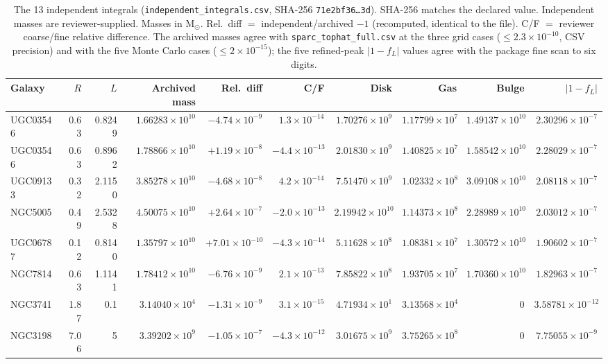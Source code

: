 \documentclass[10pt,a4paper]{article}
\newcommand{\Msun}{\mathrm{M}_\odot}
\begin{document}
\begin{table}[!htbp]\centering\scriptsize\setlength{\tabcolsep}{2.4pt}
\caption{The 13 independent integrals (\texttt{independent\_integrals.csv}, SHA-256 \texttt{71e2bf36\dots3d}). SHA-256 matches the declared value. Independent masses are reviewer-supplied. Masses in $\Msun$. Rel.\ diff $=$ independent/archived $-1$ (recomputed, identical to the file). C/F $=$ reviewer coarse/fine relative difference. The archived masses agree with \texttt{sparc\_tophat\_full.csv} at the three grid cases ($\le2.3\times10^{-10}$, CSV precision) and with the five Monte Carlo cases ($\le2\times10^{-15}$); the five refined-peak $|1-f_L|$ values agree with the package fine scan to six digits.}
\begin{tabular}{@{}lrrrrrrrrr@{}}\toprule
Galaxy & $R$ & $L$ & Archived mass & Rel.\ diff & C/F & Disk & Gas & Bulge & $|1-f_L|$\\\midrule
UGC03546 & 0.63 & 0.8249 & $1.66283\times10^{10}$ & $-4.74\times10^{-9}$ & $1.3\times10^{-14}$ & $1.70276\times10^{9}$ & $1.17799\times10^{7}$ & $1.49137\times10^{10}$ & $2.30296\times10^{-7}$\\
UGC03546 & 0.63 & 0.8962 & $1.78866\times10^{10}$ & $+1.19\times10^{-8}$ & $-4.4\times10^{-13}$ & $2.01830\times10^{9}$ & $1.40825\times10^{7}$ & $1.58542\times10^{10}$ & $2.28029\times10^{-7}$\\
UGC09133 & 0.32 & 2.1150 & $3.85278\times10^{10}$ & $-4.68\times10^{-8}$ & $4.2\times10^{-14}$ & $7.51470\times10^{9}$ & $1.02332\times10^{8}$ & $3.09108\times10^{10}$ & $2.08118\times10^{-7}$\\
NGC5005 & 0.49 & 2.5328 & $4.50075\times10^{10}$ & $+2.64\times10^{-7}$ & $-2.0\times10^{-13}$ & $2.19942\times10^{10}$ & $1.14373\times10^{8}$ & $2.28989\times10^{10}$ & $2.03012\times10^{-7}$\\
UGC06787 & 0.12 & 0.8140 & $1.35797\times10^{10}$ & $+7.01\times10^{-10}$ & $-4.3\times10^{-14}$ & $5.11628\times10^{8}$ & $1.08381\times10^{7}$ & $1.30572\times10^{10}$ & $1.90602\times10^{-7}$\\
NGC7814 & 0.63 & 1.1141 & $1.78412\times10^{10}$ & $-6.76\times10^{-9}$ & $2.1\times10^{-13}$ & $7.85822\times10^{8}$ & $1.93705\times10^{7}$ & $1.70360\times10^{10}$ & $1.82963\times10^{-7}$\\
NGC3741 & 1.87 & 0.1 & $3.14040\times10^{4}$ & $-1.31\times10^{-9}$ & $3.1\times10^{-15}$ & $4.71934\times10^{1}$ & $3.13568\times10^{4}$ & 0 & $3.58781\times10^{-12}$\\
NGC3198 & 7.06 & 5 & $3.39202\times10^{9}$ & $-1.05\times10^{-7}$ & $-4.3\times10^{-12}$ & $3.01675\times10^{9}$ & $3.75265\times10^{8}$ & 0 & $7.75055\times10^{-9}$\\

\end{tabular}
\end{table}
\end{document}
